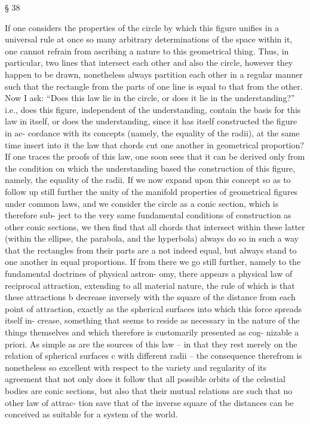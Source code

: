 § 38

If one considers the properties of the circle by which this ﬁgure uniﬁes
in a universal rule at once so many arbitrary determinations of the space
within it, one cannot refrain from ascribing a nature to this geometrical
thing. Thus, in particular, two lines that intersect each other and also the
circle, however they happen to be drawn, nonetheless always partition
each other in a regular manner such that the rectangle from the parts of
one line is equal to that from the other. Now I ask: “Does this law lie
in the circle, or does it lie in the understanding?” i.e., does this ﬁgure,
independent of the understanding, contain the basis for this law in itself,
or does the understanding, since it has itself constructed the ﬁgure in ac-
cordance with its concepts (namely, the equality of the radii), at the same
time insert into it the law that chords cut one another in geometrical
proportion? If one traces the proofs of this law, one soon sees that it can
be derived only from the condition on which the understanding based
the construction of this ﬁgure, namely, the equality of the radii. If we
now expand upon this concept so as to follow up still further the unity
of the manifold properties of geometrical ﬁgures under common laws,
and we consider the circle as a conic section, which is therefore sub-
ject to the very same fundamental conditions of construction as other
conic sections, we then ﬁnd that all chords that intersect within these
latter (within the ellipse, the parabola, and the hyperbola) always do so
in such a way that the rectangles from their parts are a not indeed equal,
but always stand to one another in equal proportions. If from there we
go still further, namely to the fundamental doctrines of physical astron-
omy, there appears a physical law of reciprocal attraction, extending to
all material nature, the rule of which is that these attractions b decrease
inversely with the square of the distance from each point of attraction,
exactly as the spherical surfaces into which this force spreads itself in-
crease, something that seems to reside as necessary in the nature of the
things themselves and which therefore is customarily presented as cog-
nizable a priori. As simple as are the sources of this law – in that they
rest merely on the relation of spherical surfaces c with different radii –
the consequence therefrom is nonetheless so excellent with respect to
the variety and regularity of its agreement that not only does it follow
that all possible orbits of the celestial bodies are conic sections, but
also that their mutual relations are such that no other law of attrac-
tion save that of the inverse square of the distances can be conceived as
suitable for a system of the world.

